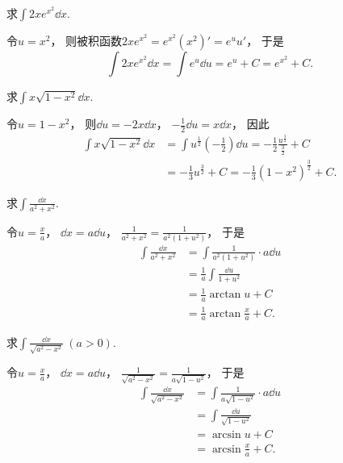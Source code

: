 \begin{example}
求\(\int 2x e^{x^2} \dd{x}\).
\begin{solution}
令\(u=x^2\)，
则被积函数\(2x e^{x^2} = e^{x^2} (x^2)' = e^u u'\)，
于是\[
	\int 2x e^{x^2} \dd{x}
	= \int e^u \dd{u}
	= e^u + C
	= e^{x^2} + C.
\]
\end{solution}
\end{example}

\begin{example}
求\(\int x \sqrt{1-x^2} \dd{x}\).
\begin{solution}
令\(u=1-x^2\)，
则\(\dd{u} = -2x\dd{x}\)，
\(-\frac{1}{2}\dd{u} = x\dd{x}\)，
因此\begin{align*}
	\int x \sqrt{1-x^2} \dd{x}
	&= \int u^{\frac{1}{2}} \left(-\frac{1}{2}\right) \dd{u}
	= -\frac{1}{2} \frac{u^{\frac{3}{2}}}{\frac{3}{2}} + C \\
	&= -\frac{1}{3} u^{\frac{3}{2}} + C
	= -\frac{1}{3} (1-x^2)^{\frac{3}{2}} + C.
\end{align*}
\end{solution}
\end{example}

\begin{example}
求\(\int \frac{\dd{x}}{a^2+x^2}\).
\begin{solution}
令\(u=\frac{x}{a}\)，
\(\dd{x}=a\dd{u}\)，
\(\frac{1}{a^2+x^2}
= \frac{1}{a^2(1+u^2)}\)，
于是\begin{align}
	\int \frac{\dd{x}}{a^2+x^2}
	&= \int \frac{1}{a^2(1+u^2)} \cdot a\dd{u}
		\nonumber \\
	&= \frac{1}{a} \int \frac{\dd{u}}{1+u^2}
		\nonumber \\
	&= \frac{1}{a} \arctan u + C
		\nonumber \\
	&= \frac{1}{a} \arctan\frac{x}{a} + C.
\end{align}
\end{solution}
\end{example}

\begin{example}
求\(\int \frac{\dd{x}}{\sqrt{a^2-x^2}}\ (a>0)\).
\begin{solution}
令\(u=\frac{x}{a}\)，
\(\dd{x}=a\dd{u}\)，
\(\frac{1}{\sqrt{a^2-x^2}}
= \frac{1}{a\sqrt{1-u^2}}\)，
于是\begin{align}
	\int \frac{\dd{x}}{\sqrt{a^2-x^2}}
	&= \int \frac{1}{a\sqrt{1-u^2}} \cdot a\dd{u}
		\nonumber \\
	&= \int \frac{\dd{u}}{\sqrt{1-u^2}}
		\nonumber \\
	&= \arcsin u + C
		\nonumber \\
	&= \arcsin\frac{x}{a} + C.
\end{align}
\end{solution}
\end{example}

